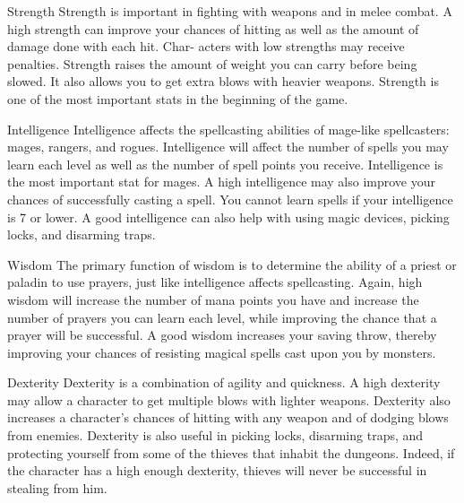           Strength
               Strength is important in fighting with weapons and in melee
               combat. A high strength can improve your chances of hitting
               as well as the amount of damage done with each hit. Char-
               acters with low strengths may receive penalties. Strength
               raises the amount of weight you can carry before being slowed.
               It also allows you to get extra blows with heavier weapons.
               Strength is one of the most important stats in the beginning
               of the game.
 
          Intelligence
               Intelligence affects the spellcasting abilities of mage-like
               spellcasters: mages, rangers, and rogues. Intelligence
               will affect the number of spells you may learn each level as
               well as the number of spell points you receive. Intelligence
               is the most important stat for mages. A high
               intelligence may also improve your chances of successfully
               casting a spell. You cannot learn spells if your intelligence
               is 7 or lower. A good intelligence can also help with using
               magic devices, picking locks, and disarming traps.
 
          Wisdom
               The primary function of wisdom is to determine the ability
               of a priest or paladin to use prayers, just like intelligence
               affects spellcasting. Again, high wisdom will increase the
               number of mana points you have and increase the number of
               prayers you can learn each level, while improving the chance
               that a prayer will be successful. A good wisdom increases
               your saving throw, thereby improving your chances of resisting
               magical spells cast upon you by monsters.
 
          Dexterity
               Dexterity is a combination of agility and quickness. A high
               dexterity may allow a character to get multiple blows with
               lighter weapons. Dexterity also increases a character's
               chances of hitting with any weapon and of dodging blows from
               enemies. Dexterity is also useful in picking locks, disarming
               traps, and protecting yourself from some of the thieves that
               inhabit the dungeons. Indeed, if the character has a high
               enough dexterity, thieves will never be successful in stealing
               from him.
 
